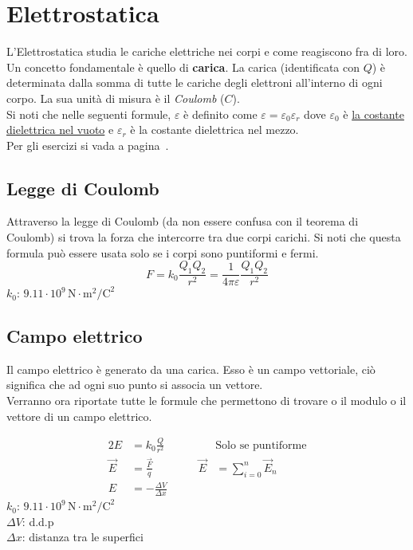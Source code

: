 
\section{Elettrostatica}\label{sec:elettrostatica}
L'Elettrostatica studia le cariche elettriche nei corpi e come reagiscono fra di loro.\\
Un concetto fondamentale è quello di \textbf{carica}. La carica (identificata con $Q$) è determinata 
dalla somma di tutte le cariche degli elettroni all'interno di ogni corpo. La sua unità di misura è il 
\emph{Coulomb} ($C$).\\[\baselineskip]
Si noti che nelle seguenti formule, $\varepsilon$ è definito come 
$\varepsilon = \varepsilon_0\varepsilon_r$ dove $\varepsilon_0$ è \hyperref[tab:e0]{la costante
dielettrica nel vuoto} e $\varepsilon_r$ è la costante dielettrica nel mezzo.\\
Per gli esercizi si vada a pagina~\pageref{ex:elettrostatica}.

\subsection{Legge di Coulomb}
Attraverso la legge di Coulomb (da non essere confusa con il teorema di Coulomb) si trova la forza che 
intercorre tra due corpi carichi. Si noti che questa formula può essere usata solo se i corpi sono 
puntiformi e fermi.
\begin{equation*}
F = k_0\frac{Q_1Q_2}{r^2} = \frac{1}{4\pi\varepsilon}\frac{Q_1Q_2}{r^2}
\end{equation*}
\hyperref[tab:k0]{$k_0$}: $9.11\cdot10^9\,\text{N}\cdot\text{m}^2\text{/C}^2$

\subsection{Campo elettrico}
Il campo elettrico è generato da una carica. Esso è un campo vettoriale, ciò significa che ad ogni
suo punto si associa un vettore.\\ 
Verranno ora riportate tutte le formule che permettono di trovare o il modulo o il vettore di un
campo elettrico.

\begin{alignat*}{2}
  E &= k_0\frac{Q}{r^2} & &\text{Solo se puntiforme}\\
  \vec{E} &= \frac{\vec{F}}{q} &\qquad \vec{E} &= \sum\limits_{i=0}^{n} \vec{E}_n\\
  E &= -\frac{\Delta V}{\Delta x} & &
\end{alignat*}
\hyperref[tab:k0]{$k_0$}: $9.11\cdot10^9\,\text{N}\cdot\text{m}^2\text{/C}^2$\\
$\Delta V$: d.d.p\\
$\Delta x$: distanza tra le superfici

